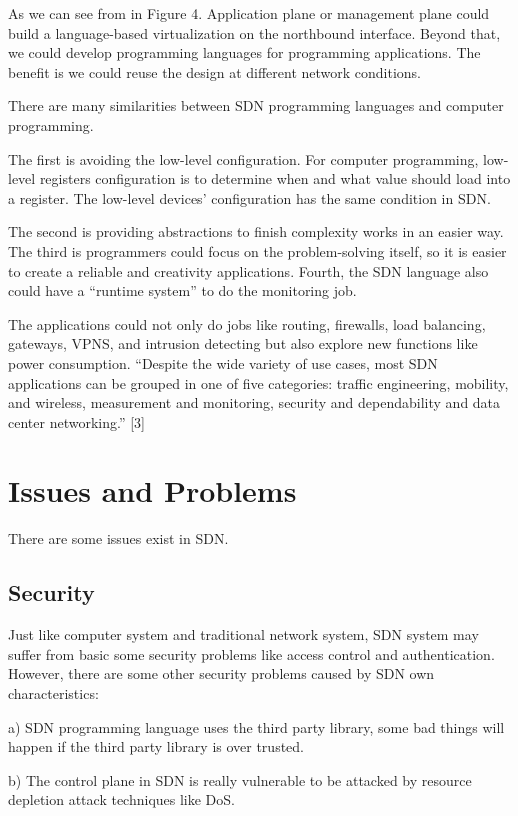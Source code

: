 \documentclass[conference]{IEEEtran}
\begin{document}
As we can see from in Figure 4. Application plane or management plane could build a language-based virtualization on the northbound interface. Beyond that, we could develop programming languages for programming applications. The benefit is we could reuse the design at different network conditions.

There are many similarities between SDN programming languages and computer programming. 

The first is avoiding the low-level configuration. For computer programming, low-level registers configuration is to determine when and what value should load into a register. The low-level devices’ configuration has the same condition in SDN.

The second is providing abstractions to finish complexity works in an easier way. The third is programmers could focus on the problem-solving itself, so it is easier to create a reliable and creativity applications. Fourth, the SDN language also could have a “runtime system” to do the monitoring job.

The applications could not only do jobs like routing, firewalls, load balancing, gateways, VPNS, and intrusion detecting but also explore new functions like power consumption. “Despite the wide variety of use cases, most SDN applications can be grouped in one of five categories: traffic engineering, mobility, and wireless, measurement and monitoring, security and dependability and data center networking.” [3]

\section{Issues and Problems}
There are some issues exist in SDN.

\subsection{Security}
Just like computer system and traditional network system, SDN system may suffer from basic some security problems like access control and authentication. However, there are some other security problems caused by SDN own characteristics:

a) SDN programming language uses the third party library, some bad things will happen if the third party library is over trusted.

b) The control plane in SDN is really vulnerable to be attacked by resource depletion attack techniques like DoS.
\end{document}
